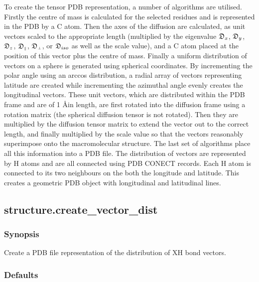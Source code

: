  To create the tensor PDB representation, a number of algorithms are utilised.  Firstly the centre of mass is calculated for the selected residues and is represented in the PDB by a C atom.  Then the axes of the diffusion are calculated, as unit vectors scaled to the appropriate length (multiplied by the eigenvalue $\mathfrak{D}_x$, $\mathfrak{D}_y$, $\mathfrak{D}_z$, $\mathfrak{D}_{\scriptscriptstyle \parallel}$, $\mathfrak{D}_{\scriptscriptstyle \perp}$, or $\mathfrak{D}_{iso}$ as well as the scale value), and a C atom placed at the position of this vector plus the centre of mass.  Finally a uniform distribution of vectors on a sphere is generated using spherical coordinates.  By incrementing the polar angle using an arccos distribution, a radial array of vectors representing latitude are created while incrementing the azimuthal angle evenly creates the longitudinal vectors.  These unit vectors, which are distributed within the PDB frame and are of 1 \AA in length, are first rotated into the diffusion frame using a rotation matrix (the spherical diffusion tensor is not rotated).  Then they are multiplied by the diffusion tensor matrix to extend the vector out to the correct length, and finally multiplied by the scale value so that the vectors reasonably superimpose onto the macromolecular structure.  The last set of algorithms place all this information into a PDB file.  The distribution of vectors are represented by H atoms and are all connected using PDB CONECT records.  Each H atom is connected to its two neighbours on the both the longitude and latitude.  This creates a geometric PDB object with longitudinal and latitudinal lines. 
  

  

 \newpage 

 \subsection{structure.create\_vector\_dist} 

  
 \subsubsection{Synopsis} 

 Create a PDB file representation of the distribution of XH bond vectors. 
  

  
 \subsubsection{Defaults} 

